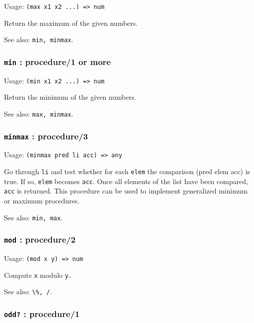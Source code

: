 \documentclass[
]{article}
\newcommand{\passthrough}[1]{#1}
\begin{document}
Usage: \passthrough{\lstinline!(max x1 x2 ...) => num!}

Return the maximum of the given numbers.

See also: \passthrough{\lstinline!min, minmax!}.

\hypertarget{min-procedure1-or-more}{%
\subsubsection{\texorpdfstring{\texttt{min} : procedure/1 or
more}{min : procedure/1 or more}}\label{min-procedure1-or-more}}

Usage: \passthrough{\lstinline!(min x1 x2 ...) => num!}

Return the minimum of the given numbers.

See also: \passthrough{\lstinline!max, minmax!}.

\hypertarget{minmax-procedure3}{%
\subsubsection{\texorpdfstring{\texttt{minmax} :
procedure/3}{minmax : procedure/3}}\label{minmax-procedure3}}

Usage: \passthrough{\lstinline!(minmax pred li acc) => any!}

Go through \passthrough{\lstinline!li!} and test whether for each
\passthrough{\lstinline!elem!} the comparison (pred elem acc) is true.
If so, \passthrough{\lstinline!elem!} becomes
\passthrough{\lstinline!acc!}. Once all elements of the list have been
compared, \passthrough{\lstinline!acc!} is returned. This procedure can
be used to implement generalized minimum or maximum procedures.

See also: \passthrough{\lstinline!min, max!}.

\hypertarget{mod-procedure2}{%
\subsubsection{\texorpdfstring{\texttt{mod} :
procedure/2}{mod : procedure/2}}\label{mod-procedure2}}

Usage: \passthrough{\lstinline!(mod x y) => num!}

Compute \passthrough{\lstinline!x!} modulo \passthrough{\lstinline!y.!}

See also: \passthrough{\lstinline!\%, /!}.

\hypertarget{odd-procedure1}{%
\subsubsection{\texorpdfstring{\texttt{odd?} :
procedure/1}{odd? : procedure/1}}\label{odd-procedure1}}
\end{document}

